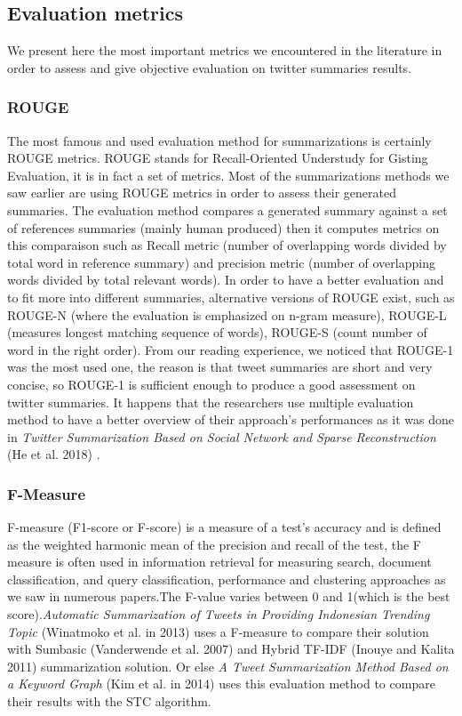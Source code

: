 \documentclass[runningheads]{llncs}
\begin{document}
\subsection{Evaluation metrics}

We present here the most important metrics we encountered in the literature in
order to assess and give objective evaluation on twitter summaries results.

\subsubsection{ROUGE}

The most famous and used evaluation method for summarizations is certainly ROUGE
metrics. ROUGE stands for Recall-Oriented Understudy for Gisting Evaluation, it
is in fact a set of metrics. Most of the summarizations methods we saw earlier
are using ROUGE metrics in order to assess their generated summaries.
The evaluation method compares a generated summary against a set of references
summaries (mainly human produced) then it computes metrics on this comparaison
such as Recall metric (number of overlapping words divided by total word in
reference summary) and precision metric (number of overlapping words divided by
total relevant words). In order to have a better evaluation and to fit more into
different summaries, alternative versions of ROUGE exist, such as ROUGE-N
(where the evaluation is emphasized on n-gram measure), ROUGE-L (measures
longest matching sequence of words), ROUGE-S (count number of word in the right
order). From our reading experience, we noticed that ROUGE-1 was the most used
one, the reason is that tweet summaries are short and very concise, so ROUGE-1
is sufficient enough to produce a good assessment on twitter summaries. It
happens that the researchers use multiple evaluation method to have a better
overview of their approach's performances as it was done in \textit{Twitter
Summarization Based on Social Network and Sparse Reconstruction} (He et al.
2018) \cite{he_twitter_nodate}.

\subsubsection{F-Measure}

F-measure (F1-score or F-score) is a measure of a test's accuracy and is
defined as the weighted harmonic mean of the precision and recall of the test,
the F measure is often used in information retrieval for measuring search,
document classification, and query classification, performance and clustering
approaches as we saw in numerous papers.The F-value varies between 0 and
1(which is the best score).\textit{Automatic Summarization of Tweets in
Providing Indonesian Trending Topic} (Winatmoko et al. in 2013)
\cite{winatmoko_automatic_2013} uses a F-measure to compare their solution with
Sumbasic (Vanderwende et al. 2007) \cite{vanderwende_beyond_2007} and Hybrid
TF-IDF (Inouye and Kalita 2011) \cite{inouye_comparing_2011} summarization
solution. Or else \textit{A Tweet Summarization Method Based on a Keyword
Graph} (Kim et al. in 2014) \cite{kim_tweet_2014} uses this evaluation method
to compare their results with the STC algorithm.
\end{document}
